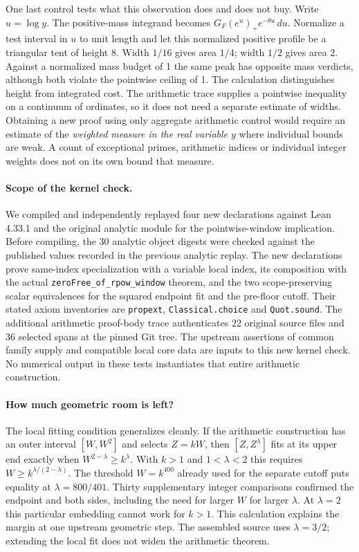 \documentclass[12pt,letterpaper]{article}
\begin{document}
One last control tests what this observation does and does not buy. Write \(u=\log y\). The positive-mass integrand becomes \(G_F(e^u)_+ e^{-\theta u}\,du\). Normalize a test interval in \(u\) to unit length and let this normalized positive profile be a triangular tent of height 8. Width \(1/16\) gives area \(1/4\); width \(1/2\) gives area 2. Against a normalized mass budget of 1 the same peak has opposite mass verdicts, although both violate the pointwise ceiling of 1. The calculation distinguishes height from integrated cost. The arithmetic trace supplies a pointwise inequality on a continuum of ordinates, so it does not need a separate estimate of widths. Obtaining a new proof using only aggregate arithmetic control would require an estimate of the \emph{weighted measure in the real variable \(y\)} where individual bounds are weak. A count of exceptional primes, arithmetic indices or individual integer weights does not on its own bound that measure.

\paragraph{Scope of the kernel check.}
We compiled and independently replayed four new declarations against Lean 4.33.1 and the original analytic module for the pointwise-window implication. Before compiling, the 30 analytic object digests were checked against the published values recorded in the previous analytic replay. The new declarations prove same-index specialization with a variable local index, its composition with the actual \texttt{zeroFree\_of\_rpow\_window} theorem, and the two scope-preserving scalar equivalences for the squared endpoint fit and the pre-floor cutoff. Their stated axiom inventories are \texttt{propext}, \texttt{Classical.choice} and \texttt{Quot.sound}. The additional arithmetic proof-body trace authenticates 22 original source files and 36 selected spans at the pinned Git tree. The upstream assertions of common family supply and compatible local core data are inputs to this new kernel check. No numerical output in these tests instantiates that entire arithmetic construction.

\paragraph{How much geometric room is left?}
The local fitting condition generalizes cleanly. If the arithmetic construction has an outer interval \([W,W^2]\) and selects \(Z=kW\), then \([Z,Z^\lambda]\) fits at its upper end exactly when \(W^{2-\lambda}\ge k^\lambda\). With \(k>1\) and \(1<\lambda<2\) this requires \(W\ge k^{\lambda/(2-\lambda)}\). The threshold \(W=k^{400}\) already used for the separate cutoff puts equality at \(\lambda=800/401\). Thirty supplementary integer comparisons confirmed the endpoint and both sides, including the need for larger \(W\) for larger \(\lambda\). At \(\lambda=2\) this particular embedding cannot work for \(k>1\). This calculation explains the margin at one upstream geometric step. The assembled source uses \(\lambda=3/2\); extending the local fit does not widen the arithmetic theorem.
\end{document}
